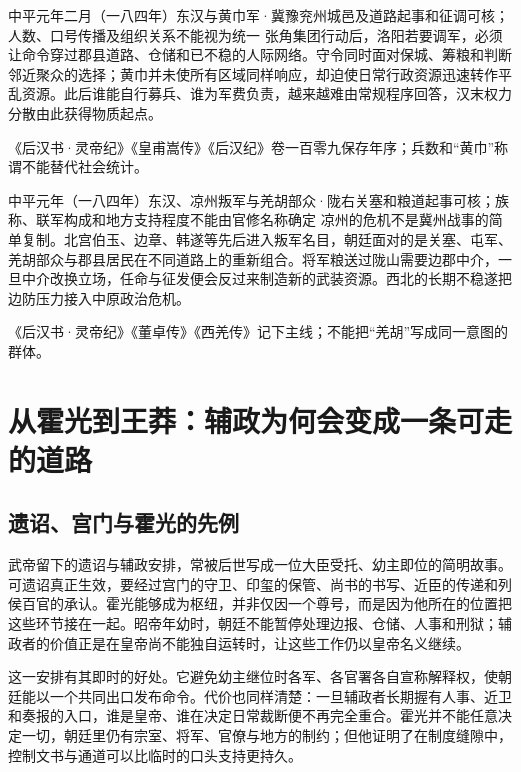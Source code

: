 \begin{event}{}{中平元年二月（一八四年）}{东汉与黄巾军·冀豫兖州城邑及道路}{起事和征调可核；人数、口号传播及组织关系不能视为统一}
张角集团行动后，洛阳若要调军，必须让命令穿过郡县道路、仓储和已不稳的人际网络。守令同时面对保城、筹粮和判断邻近聚众的选择；黄巾并未使所有区域同样响应，却迫使日常行政资源迅速转作平乱资源。此后谁能自行募兵、谁为军费负责，越来越难由常规程序回答，汉末权力分散由此获得物质起点。

《后汉书·灵帝纪》《皇甫嵩传》《后汉纪》卷一百零九保存年序；兵数和“黄巾”称谓不能替代社会统计。
\end{event}

\begin{event}{}{中平元年（一八四年）}{东汉、凉州叛军与羌胡部众·陇右关塞和粮道}{起事可核；族称、联军构成和地方支持程度不能由官修名称确定}
凉州的危机不是冀州战事的简单复制。北宫伯玉、边章、韩遂等先后进入叛军名目，朝廷面对的是关塞、屯军、羌胡部众与郡县居民在不同道路上的重新组合。将军粮送过陇山需要边郡中介，一旦中介改换立场，任命与征发便会反过来制造新的武装资源。西北的长期不稳遂把边防压力接入中原政治危机。

《后汉书·灵帝纪》《董卓传》《西羌传》记下主线；不能把“羌胡”写成同一意图的群体。
\end{event}

\section{从霍光到王莽：辅政为何会变成一条可走的道路}

\subsection{遗诏、宫门与霍光的先例}

武帝留下的遗诏与辅政安排，常被后世写成一位大臣受托、幼主即位的简明故事。可遗诏真正生效，要经过宫门的守卫、印玺的保管、尚书的书写、近臣的传递和列侯百官的承认。霍光能够成为枢纽，并非仅因一个尊号，而是因为他所在的位置把这些环节接在一起。昭帝年幼时，朝廷不能暂停处理边报、仓储、人事和刑狱；辅政者的价值正是在皇帝尚不能独自运转时，让这些工作仍以皇帝名义继续。

这一安排有其即时的好处。它避免幼主继位时各军、各官署各自宣称解释权，使朝廷能以一个共同出口发布命令。代价也同样清楚：一旦辅政者长期握有人事、近卫和奏报的入口，谁是皇帝、谁在决定日常裁断便不再完全重合。霍光并不能任意决定一切，朝廷里仍有宗室、将军、官僚与地方的制约；但他证明了在制度缝隙中，控制文书与通道可以比临时的口头支持更持久。

